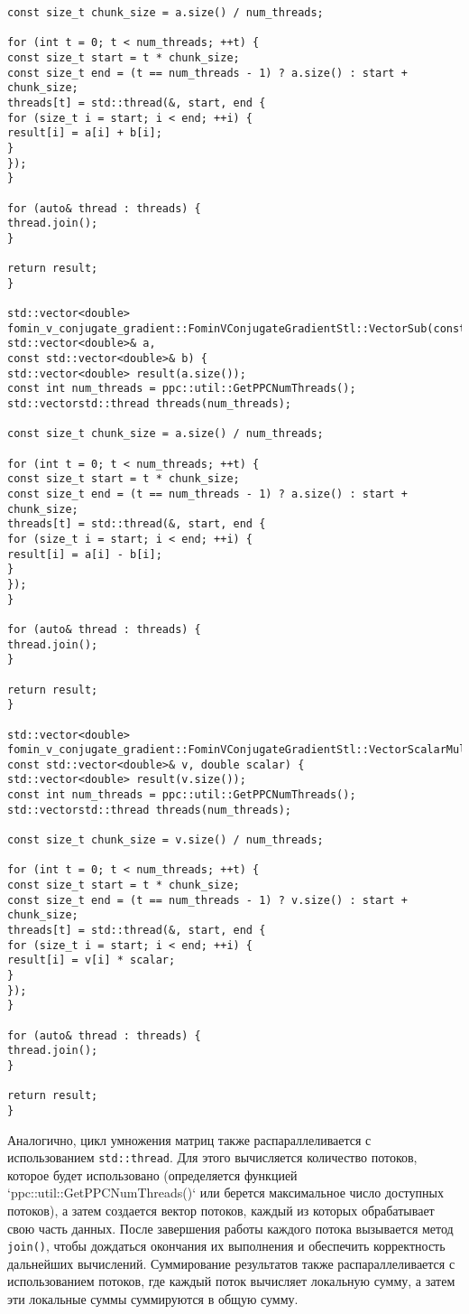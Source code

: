 \documentclass[12pt]{article}
\begin{document}
\begin{verbatim}
const size_t chunk_size = a.size() / num_threads;

for (int t = 0; t < num_threads; ++t) {
const size_t start = t * chunk_size;
const size_t end = (t == num_threads - 1) ? a.size() : start + chunk_size;
threads[t] = std::thread(&, start, end {
for (size_t i = start; i < end; ++i) {
result[i] = a[i] + b[i];
}
});
}

for (auto& thread : threads) {
thread.join();
}

return result;
}

std::vector<double> fomin_v_conjugate_gradient::FominVConjugateGradientStl::VectorSub(const std::vector<double>& a,
const std::vector<double>& b) {
std::vector<double> result(a.size());
const int num_threads = ppc::util::GetPPCNumThreads();
std::vectorstd::thread threads(num_threads);

const size_t chunk_size = a.size() / num_threads;

for (int t = 0; t < num_threads; ++t) {
const size_t start = t * chunk_size;
const size_t end = (t == num_threads - 1) ? a.size() : start + chunk_size;
threads[t] = std::thread(&, start, end {
for (size_t i = start; i < end; ++i) {
result[i] = a[i] - b[i];
}
});
}

for (auto& thread : threads) {
thread.join();
}

return result;
}

std::vector<double> fomin_v_conjugate_gradient::FominVConjugateGradientStl::VectorScalarMultiply(
const std::vector<double>& v, double scalar) {
std::vector<double> result(v.size());
const int num_threads = ppc::util::GetPPCNumThreads();
std::vectorstd::thread threads(num_threads);

const size_t chunk_size = v.size() / num_threads;

for (int t = 0; t < num_threads; ++t) {
const size_t start = t * chunk_size;
const size_t end = (t == num_threads - 1) ? v.size() : start + chunk_size;
threads[t] = std::thread(&, start, end {
for (size_t i = start; i < end; ++i) {
result[i] = v[i] * scalar;
}
});
}

for (auto& thread : threads) {
thread.join();
}

return result;
}
\end{verbatim}

Аналогично, цикл умножения матриц также распараллеливается с использованием \texttt{std::thread}. Для этого вычисляется количество потоков, которое будет использовано (определяется функцией `ppc::util::GetPPCNumThreads()` или берется максимальное число доступных потоков), а затем создается вектор потоков, каждый из которых обрабатывает свою часть данных. После завершения работы каждого потока вызывается метод \texttt{join()}, чтобы дождаться окончания их выполнения и обеспечить корректность дальнейших вычислений.  Суммирование результатов также распараллеливается с использованием потоков, где каждый поток вычисляет локальную сумму, а затем эти локальные суммы суммируются в общую сумму.
\end{document}
